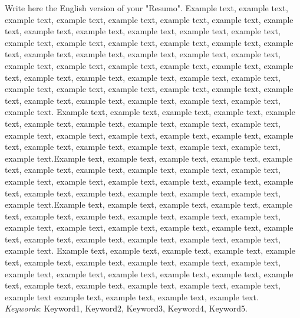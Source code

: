 Write here the English version of your "Resumo". Example text, example text, example text, example text, example text, example text, example text, example text, example text, example text, example text, example text, example text, example text, example text, example text, example text, example text, example text, example text, example text, example text, example text, example text, example text, example text, example text, example text, example text, example text, example text, example text, example text, example text, example text, example text, example text, example text, example text, example text, example text, example text, example text, example text, example text, example text, example text. Example text, example text, example text, example text, example text, example text, example text, example text, example text, example text, example text, example text, example text, example text, example text, example text, example text, example text, example text, example text, example text, example text.Example text, example text, example text, example text, example text, example text, example text, example text, example text, example text, example text, example text, example text, example text, example text, example text, example text, example text, example text, example text, example text, example text.Example text, example text, example text, example text, example text, example text, example text, example text, example text, example text, example text, example text, example text, example text, example text, example text, example text, example text, example text, example text, example text, example text. Example text, example text, example text, example text, example text, example text, example text, example text, example text, example text, example text, example text, example text, example text, example text, example text, example text, example text, example text, example text, example text, example text example text, example text, example text, example text.
\\

\vspace{1cm}
\noindent
\emph{Keywords}: Keyword1, Keyword2, Keyword3, Keyword4, Keyword5.